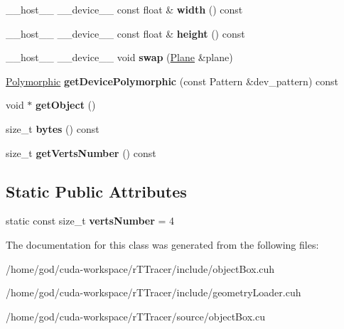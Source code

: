 \begin{DoxyCompactItemize}
\item 
\+\_\+\+\_\+host\+\_\+\+\_\+ \+\_\+\+\_\+device\+\_\+\+\_\+ const float \& {\bfseries width} () const\hypertarget{class_plane_a1c91bd58a15624b97a10912ed8169406}{}\label{class_plane_a1c91bd58a15624b97a10912ed8169406}

\item 
\+\_\+\+\_\+host\+\_\+\+\_\+ \+\_\+\+\_\+device\+\_\+\+\_\+ const float \& {\bfseries height} () const\hypertarget{class_plane_af8ebbcfced6954ead0f5efc91c532b95}{}\label{class_plane_af8ebbcfced6954ead0f5efc91c532b95}

\item 
\+\_\+\+\_\+host\+\_\+\+\_\+ \+\_\+\+\_\+device\+\_\+\+\_\+ void {\bfseries swap} (\hyperlink{class_plane}{Plane} \&plane)\hypertarget{class_plane_abd61cd7527ed084a867050bee3f4c4ec}{}\label{class_plane_abd61cd7527ed084a867050bee3f4c4ec}

\item 
\hyperlink{struct_polymorphic}{Polymorphic} {\bfseries get\+Device\+Polymorphic} (const Pattern \&dev\+\_\+pattern) const\hypertarget{class_plane_a67ce79f9411d96c278f0a3e7c2438f11}{}\label{class_plane_a67ce79f9411d96c278f0a3e7c2438f11}

\item 
void $\ast$ {\bfseries get\+Object} ()\hypertarget{class_plane_ac638c29a88ee505c9b84bcf79ba67509}{}\label{class_plane_ac638c29a88ee505c9b84bcf79ba67509}

\item 
size\+\_\+t {\bfseries bytes} () const\hypertarget{class_plane_a8a95c1d089d188c4c927bc67e5139775}{}\label{class_plane_a8a95c1d089d188c4c927bc67e5139775}

\item 
size\+\_\+t {\bfseries get\+Verts\+Number} () const\hypertarget{class_plane_aecf40d0480c922b6513be086f1a732a7}{}\label{class_plane_aecf40d0480c922b6513be086f1a732a7}

\end{DoxyCompactItemize}
\subsection*{Static Public Attributes}
\begin{DoxyCompactItemize}
\item 
static const size\+\_\+t {\bfseries verts\+Number} = 4\hypertarget{class_plane_a6b7d31dd30df60bfde03401356211b96}{}\label{class_plane_a6b7d31dd30df60bfde03401356211b96}

\end{DoxyCompactItemize}


The documentation for this class was generated from the following files\+:\begin{DoxyCompactItemize}
\item 
/home/god/cuda-\/workspace/r\+T\+Tracer/include/object\+Box.\+cuh\item 
/home/god/cuda-\/workspace/r\+T\+Tracer/include/geometry\+Loader.\+cuh\item 
/home/god/cuda-\/workspace/r\+T\+Tracer/source/object\+Box.\+cu\end{DoxyCompactItemize}
